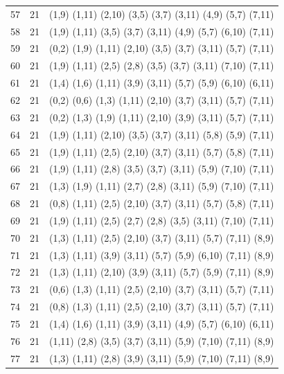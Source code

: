 \begin{appendix}
{\begin{longtable}{lll}
    57 & 21 & (1,9)   (1,11)  (2,10)  (3,5)   (3,7)   (3,11)  (4,9)   (5,7)   (7,11)\\
    58 & 21 & (1,9)   (1,11)  (3,5)   (3,7)   (3,11)  (4,9)   (5,7)   (6,10)  (7,11)\\
    59 & 21 & (0,2)   (1,9)   (1,11)  (2,10)  (3,5)   (3,7)   (3,11)  (5,7)   (7,11)\\
    60 & 21 & (1,9)   (1,11)  (2,5)   (2,8)   (3,5)   (3,7)   (3,11)  (7,10)  (7,11)\\
    61 & 21 & (1,4)   (1,6)   (1,11)  (3,9)   (3,11)  (5,7)   (5,9)   (6,10)  (6,11)\\
    62 & 21 & (0,2)   (0,6)   (1,3)   (1,11)  (2,10)  (3,7)   (3,11)  (5,7)   (7,11)\\
    63 & 21 & (0,2)   (1,3)   (1,9)   (1,11)  (2,10)  (3,9)   (3,11)  (5,7)   (7,11)\\
    64 & 21 & (1,9)   (1,11)  (2,10)  (3,5)   (3,7)   (3,11)  (5,8)   (5,9)   (7,11)\\
    65 & 21 & (1,9)   (1,11)  (2,5)   (2,10)  (3,7)   (3,11)  (5,7)   (5,8)   (7,11)\\
    66 & 21 & (1,9)   (1,11)  (2,8)   (3,5)   (3,7)   (3,11)  (5,9)   (7,10)  (7,11)\\
    67 & 21 & (1,3)   (1,9)   (1,11)  (2,7)   (2,8)   (3,11)  (5,9)   (7,10)  (7,11)\\
    68 & 21 & (0,8)   (1,11)  (2,5)   (2,10)  (3,7)   (3,11)  (5,7)   (5,8)   (7,11)\\
    69 & 21 & (1,9)   (1,11)  (2,5)   (2,7)   (2,8)   (3,5)   (3,11)  (7,10)  (7,11)\\
    70 & 21 & (1,3)   (1,11)  (2,5)   (2,10)  (3,7)   (3,11)  (5,7)   (7,11)  (8,9)\\
    71 & 21 & (1,3)   (1,11)  (3,9)   (3,11)  (5,7)   (5,9)   (6,10)  (7,11)  (8,9)\\
    72 & 21 & (1,3)   (1,11)  (2,10)  (3,9)   (3,11)  (5,7)   (5,9)   (7,11)  (8,9)\\
    73 & 21 & (0,6)   (1,3)   (1,11)  (2,5)   (2,10)  (3,7)   (3,11)  (5,7)   (7,11)\\
    74 & 21 & (0,8)   (1,3)   (1,11)  (2,5)   (2,10)  (3,7)   (3,11)  (5,7)   (7,11)\\
    75 & 21 & (1,4)   (1,6)   (1,11)  (3,9)   (3,11)  (4,9)   (5,7)   (6,10)  (6,11)\\
    76 & 21 & (1,11)  (2,8)   (3,5)   (3,7)   (3,11)  (5,9)   (7,10)  (7,11)  (8,9)\\
    77 & 21 & (1,3)   (1,11)  (2,8)   (3,9)   (3,11)  (5,9)   (7,10)  (7,11)  (8,9)\\

\end{longtable}}
\end{appendix}
